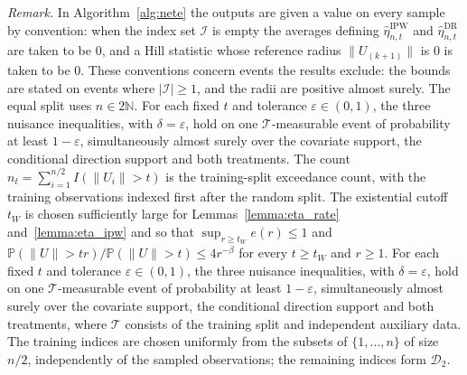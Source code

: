 \documentclass[12pt]{article}
\theoremstyle{plain}
\theoremstyle{definition}
\begin{document}
\noindent\textit{Remark.} In Algorithm~\ref{alg:nete} the outputs are given a value on every sample by convention: when the index set $\mathcal I$ is empty the averages defining $\hat\eta_{n,t}^{\mathrm{IPW}}$ and $\hat\eta_{n,t}^{\mathrm{DR}}$ are taken to be $0$, and a Hill statistic whose reference radius $\|U_{(k+1)}\|$ is $0$ is taken to be $0$. These conventions concern events the results exclude: the bounds are stated on events where $|\mathcal I|\geq1$, and the radii are positive almost surely. The equal split uses $n\in2\mathbb N$. For each fixed $t$ and tolerance $\varepsilon\in(0,1)$, the three nuisance inequalities, with $\delta=\varepsilon$, hold on one $\mathcal T$-measurable event of probability at least $1-\varepsilon$, simultaneously almost surely over the covariate support, the conditional direction support and both treatments. The count $n_t=\sum_{i=1}^{n/2}I(\|U_i\|>t)$ is the training-split exceedance count, with the training observations indexed first after the random split. The existential cutoff $t_W$ is chosen sufficiently large for Lemmas~\ref{lemma:eta_rate} and~\ref{lemma:eta_ipw} and so that $\sup_{r\geq t_W}e(r)\leq1$ and $\mathbb P(\|U\|>tr)/\mathbb P(\|U\|>t)\leq4r^{-\beta}$ for every $t\geq t_W$ and $r\geq1$. For each fixed $t$ and tolerance $\varepsilon\in(0,1)$, the three nuisance inequalities, with $\delta=\varepsilon$, hold on one $\mathcal T$-measurable event of probability at least $1-\varepsilon$, simultaneously almost surely over the covariate support, the conditional direction support and both treatments, where $\mathcal T$ consists of the training split and independent auxiliary data. The training indices are chosen uniformly from the subsets of $\{1,\ldots,n\}$ of size $n/2$, independently of the sampled observations; the remaining indices form $\mathcal D_2$.
\end{document}
